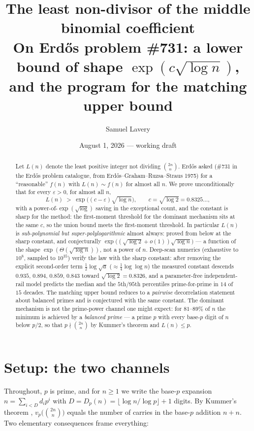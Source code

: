 \documentclass[11pt]{article}
\title{The least non-divisor of the middle binomial coefficient\\
\large On Erd\H{o}s problem \#731: a lower bound of shape $\exp(c\sqrt{\log n})$,\\
and the program for the matching upper bound}
\author{Samuel Lavery}
\date{August 1, 2026 --- working draft}
\newcommand{\eps}{\varepsilon}
\begin{document}
\maketitle

\begin{abstract}
Let $L(n)$ denote the least positive integer not dividing $\binom{2n}{n}$.
Erd\H{o}s asked (\#731 in the Erd\H{o}s problem catalogue, from
Erd\H{o}s--Graham--Ruzsa--Straus 1975) for a ``reasonable'' $f(n)$ with
$L(n)\sim f(n)$ for almost all $n$.  We prove unconditionally that for every
$\eps>0$, for almost all $n$,
\[
L(n)\;>\;\exp\bigl((c-\eps)\sqrt{\log n}\bigr),\qquad
c=\sqrt{\log 2}=0.8325\dots,
\]
with a power-of-$\exp(\sqrt{\log})$ saving in the exceptional count, and the
constant is sharp for the method: the first-moment threshold for the dominant
mechanism sits at the same $c$, so the union bound meets the first-moment
threshold.  In
particular $L(n)$ is \emph{sub-polynomial but super-polylogarithmic} almost
always: proved from below at the sharp constant, and conjecturally
$\exp\bigl((\sqrt{\log2}+o(1))\sqrt{\log n}\bigr)$ --- a function of the
shape $\exp(\Theta(\sqrt{\log n}))$, not a power of $n$.  Deep-scan numerics
(exhaustive to $10^8$, sampled to $10^{35}$) verify the law with the sharp
constant: after removing the explicit second-order term
$\tfrac12\log\sqrt a$ ($\approx\tfrac14\log\log n$)
the measured constant descends $0.935,\,0.894,\,0.859,\,0.843$ toward
$\sqrt{\log2}=0.8326$, and a parameter-free independent-rail model predicts
the median and the $5$th/$95$th percentiles prime-for-prime in $14$ of $15$
decades.  The matching upper bound reduces to a \emph{pairwise}
decorrelation statement about balanced primes and is conjectured with the
same constant.  The dominant mechanism is not the prime-power channel one
might expect: for $81$--$89\%$ of $n$ the minimum is achieved by a
\emph{balanced prime} --- a prime $p$ with every base-$p$ digit of $n$ below
$p/2$, so that $p\nmid\binom{2n}{n}$ by Kummer's theorem and $L(n)\le p$.
\end{abstract}

\section{Setup: the two channels}

Throughout, $p$ is prime, and for $n\ge1$ we write the base-$p$ expansion
$n=\sum_{i<D}d_ip^i$ with $D=D_p(n)=\lfloor\log n/\log p\rfloor+1$ digits.
By Kummer's theorem \cite{Kummer}, $v_p\bigl(\binom{2n}{n}\bigr)$ equals the
number of carries in the base-$p$ addition $n+n$.  Two elementary
consequences frame everything:
\end{document}
